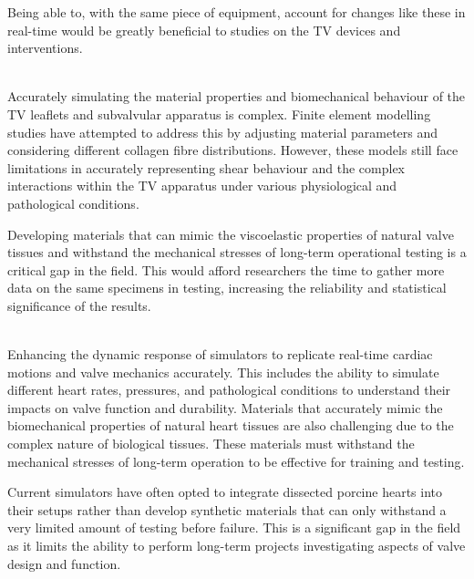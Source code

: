 Being able to, with the same piece of equipment, account for changes like these in real-time would be greatly beneficial to studies on the \gls{TV} devices and interventions.

\\
Accurately simulating the material properties and biomechanical behaviour of the TV leaflets and subvalvular apparatus is complex. Finite element modelling studies have attempted to address this by adjusting material parameters and considering different collagen fibre distributions. However, these models still face limitations in accurately representing shear behaviour and the complex interactions within the TV apparatus under various physiological and pathological conditions.~

Developing materials that can mimic the viscoelastic properties of natural valve tissues and withstand the mechanical stresses of long-term operational testing is a critical gap in the field. This would afford researchers the time to gather more data on the same specimens in testing, increasing the reliability and statistical significance of the results.

\\
Enhancing the dynamic response of simulators to replicate real-time cardiac motions and valve mechanics accurately. This includes the ability to simulate different heart rates, pressures, and pathological conditions to understand their impacts on valve function and durability. Materials that accurately mimic the biomechanical properties of natural heart tissues are also challenging due to the complex nature of biological tissues. These materials must withstand the mechanical stresses of long-term operation to be effective for training and testing.

Current simulators have often opted to integrate dissected porcine hearts into their setups rather than develop synthetic materials that can only withstand a very limited amount of testing before failure. This is a significant gap in the field as it limits the ability to perform long-term projects investigating aspects of valve design and function.


